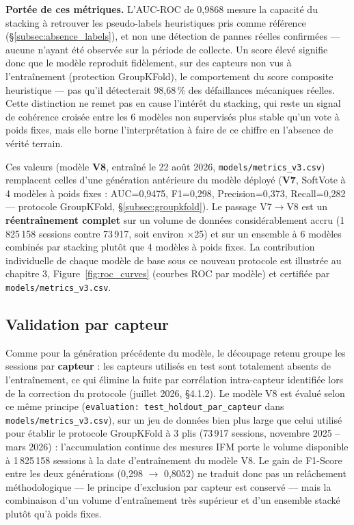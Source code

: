 \documentclass[12pt,a4paper]{report}
\begin{document}
\noindent\textbf{Portée de ces métriques.} L'AUC-ROC de 0,9868 mesure la capacité du
stacking à retrouver les pseudo-labels heuristiques pris comme référence
(\S\ref{subsec:absence_labels}), et non une détection de pannes réelles confirmées —
aucune n'ayant été observée sur la période de collecte. Un score élevé signifie donc que
le modèle reproduit fidèlement, sur des capteurs non vus à l'entraînement (protection
GroupKFold), le comportement du score composite heuristique — pas qu'il détecterait
98,68\,\% des défaillances mécaniques réelles. Cette distinction ne remet pas en cause
l'intérêt du stacking, qui reste un signal de cohérence croisée entre les 6 modèles non
supervisés plus stable qu'un vote à poids fixes, mais elle borne l'interprétation à faire
de ce chiffre en l'absence de vérité terrain.

\begin{correctionbox}
Ces valeurs (modèle \textbf{V8}, entraîné le 22 août 2026, \texttt{models/metrics\_v3.csv})
remplacent celles d'une génération antérieure du modèle déployé (\textbf{V7}, SoftVote à
4 modèles à poids fixes : AUC=0,9475, F1=0,298, Precision=0,373, Recall=0,282 — protocole
GroupKFold, \S\ref{subsec:groupkfold}). Le passage V7$\to$V8 est un \textbf{réentraînement
complet} sur un volume de données considérablement accru (1\,825\,158 sessions contre
73\,917, soit environ ×25) et sur un ensemble à 6 modèles combinés par stacking plutôt que
4 modèles à poids fixes. La contribution individuelle de chaque modèle de base sous ce
nouveau protocole est illustrée au chapitre 3, Figure~\ref{fig:roc_curves} (courbes ROC
par modèle) et certifiée par \texttt{models/metrics\_v3.csv}.
\end{correctionbox}

\subsection{Validation par capteur}

Comme pour la génération précédente du modèle, le découpage retenu groupe les sessions par
\textbf{capteur} : les capteurs utilisés en test sont totalement absents de l'entraînement,
ce qui élimine la fuite par corrélation intra-capteur identifiée lors de la correction du
protocole (juillet 2026, \S4.1.2). Le modèle V8 est évalué selon ce même principe
(\texttt{evaluation: test\_holdout\_par\_capteur} dans \texttt{models/metrics\_v3.csv}), sur
un jeu de données bien plus large que celui utilisé pour établir le protocole GroupKFold à
3 plis (73\,917 sessions, novembre 2025 -- mars 2026) : l'accumulation continue des mesures
IFM porte le volume disponible à 1\,825\,158 sessions à la date d'entraînement du modèle
V8. Le gain de F1-Score entre les deux générations (0,298 $\to$ 0,8052) ne traduit donc pas
un relâchement méthodologique — le principe d'exclusion par capteur est conservé — mais la
combinaison d'un volume d'entraînement très supérieur et d'un ensemble stacké plutôt qu'à
poids fixes.
\end{document}
